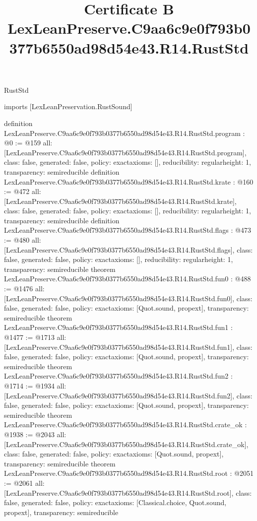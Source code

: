 \begin{lexlean}{RustStd}
\title{Certificate B LexLeanPreserve.C9aa6c9e0f793b0377b6550ad98d54e43.R14.RustStd}
\begin{coremodule}
imports [LexLeanPreservation.RustSound]

definition LexLeanPreserve.C9aa6c9e0f793b0377b6550ad98d54e43.R14.RustStd.program : @0 := @159 {
  all: [LexLeanPreserve.C9aa6c9e0f793b0377b6550ad98d54e43.R14.RustStd.program],
  class: false,
  generated: false,
  policy: exact{axioms: []},
  reducibility: regular{height: 1},
  transparency: semireducible
}
definition LexLeanPreserve.C9aa6c9e0f793b0377b6550ad98d54e43.R14.RustStd.krate : @160 := @472 {
  all: [LexLeanPreserve.C9aa6c9e0f793b0377b6550ad98d54e43.R14.RustStd.krate],
  class: false,
  generated: false,
  policy: exact{axioms: []},
  reducibility: regular{height: 1},
  transparency: semireducible
}
definition LexLeanPreserve.C9aa6c9e0f793b0377b6550ad98d54e43.R14.RustStd.flags : @473 := @480 {
  all: [LexLeanPreserve.C9aa6c9e0f793b0377b6550ad98d54e43.R14.RustStd.flags],
  class: false,
  generated: false,
  policy: exact{axioms: []},
  reducibility: regular{height: 1},
  transparency: semireducible
}
theorem LexLeanPreserve.C9aa6c9e0f793b0377b6550ad98d54e43.R14.RustStd.fun0 : @488 := @1476 {
  all: [LexLeanPreserve.C9aa6c9e0f793b0377b6550ad98d54e43.R14.RustStd.fun0],
  class: false,
  generated: false,
  policy: exact{axioms: [Quot.sound, propext]},
  transparency: semireducible
}
theorem LexLeanPreserve.C9aa6c9e0f793b0377b6550ad98d54e43.R14.RustStd.fun1 : @1477 := @1713 {
  all: [LexLeanPreserve.C9aa6c9e0f793b0377b6550ad98d54e43.R14.RustStd.fun1],
  class: false,
  generated: false,
  policy: exact{axioms: [Quot.sound, propext]},
  transparency: semireducible
}
theorem LexLeanPreserve.C9aa6c9e0f793b0377b6550ad98d54e43.R14.RustStd.fun2 : @1714 := @1934 {
  all: [LexLeanPreserve.C9aa6c9e0f793b0377b6550ad98d54e43.R14.RustStd.fun2],
  class: false,
  generated: false,
  policy: exact{axioms: [Quot.sound, propext]},
  transparency: semireducible
}
theorem LexLeanPreserve.C9aa6c9e0f793b0377b6550ad98d54e43.R14.RustStd.crate_ok : @1938 := @2043 {
  all: [LexLeanPreserve.C9aa6c9e0f793b0377b6550ad98d54e43.R14.RustStd.crate_ok],
  class: false,
  generated: false,
  policy: exact{axioms: [Quot.sound, propext]},
  transparency: semireducible
}
theorem LexLeanPreserve.C9aa6c9e0f793b0377b6550ad98d54e43.R14.RustStd.root : @2051 := @2061 {
  all: [LexLeanPreserve.C9aa6c9e0f793b0377b6550ad98d54e43.R14.RustStd.root],
  class: false,
  generated: false,
  policy: exact{axioms: [Classical.choice, Quot.sound, propext]},
  transparency: semireducible
}


\end{coremodule}
\end{lexlean}
